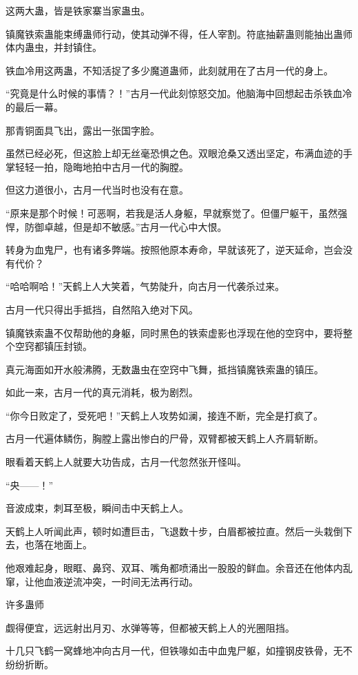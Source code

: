 \begin{this_body}
这两大蛊，皆是铁家寨当家蛊虫。

镇魔铁索蛊能束缚蛊师行动，使其动弹不得，任人宰割。符底抽薪蛊则能抽出蛊师体内蛊虫，并封镇住。

铁血冷用这两蛊，不知活捉了多少魔道蛊师，此刻就用在了古月一代的身上。

“究竟是什么时候的事情？！”古月一代此刻惊怒交加。他脑海中回想起击杀铁血冷的最后一幕。

那青铜面具飞出，露出一张国字脸。

虽然已经必死，但这脸上却无丝毫恐惧之色。双眼沧桑又透出坚定，布满血迹的手掌轻轻一拍，隐晦地拍中古月一代的胸膛。

但这力道很小，古月一代当时也没有在意。

“原来是那个时候！可恶啊，若我是活人身躯，早就察觉了。但僵尸躯干，虽然强悍，防御卓越，但是却不敏感。”古月一代心中大恨。

转身为血鬼尸，也有诸多弊端。按照他原本寿命，早就该死了，逆天延命，岂会没有代价？

“哈哈啊哈！”天鹤上人大笑着，气势陡升，向古月一代袭杀过来。

古月一代只得出手抵挡，自然陷入绝对下风。

镇魔铁索蛊不仅帮助他的身躯，同时黑色的铁索虚影也浮现在他的空窍中，要将整个空窍都镇压封锁。

真元海面如开水般沸腾，无数蛊虫在空窍中飞舞，抵挡镇魔铁索蛊的镇压。

如此一来，古月一代的真元消耗，极为剧烈。

“你今日败定了，受死吧！”天鹤上人攻势如澜，接连不断，完全是打疯了。

古月一代遍体鳞伤，胸膛上露出惨白的尸骨，双臂都被天鹤上人齐肩斩断。

眼看着天鹤上人就要大功告成，古月一代忽然张开怪叫。

“央——！”

音波成束，刺耳至极，瞬间击中天鹤上人。

天鹤上人听闻此声，顿时如遭巨击，飞退数十步，白眉都被拉直。然后一头栽倒下去，也落在地面上。

他艰难起身，眼眶、鼻窍、双耳、嘴角都喷涌出一股股的鲜血。余音还在他体内乱窜，让他血液逆流冲突，一时间无法再行动。

许多蛊师

觑得便宜，远远射出月刃、水弹等等，但都被天鹤上人的光圈阻挡。

十几只飞鹤一窝蜂地冲向古月一代，但铁喙如击中血鬼尸躯，如撞钢皮铁骨，无不纷纷折断。


\end{this_body}
